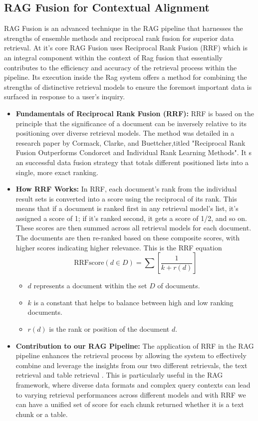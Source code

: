 \subsection{RAG Fusion for Contextual Alignment}
RAG Fusion is an advanced technique in the RAG pipeline that harnesses the strengths of ensemble methods and reciprocal rank fusion for superior data retrieval.
\vskip 0.5cm
At it's core RAG Fusion uses Reciprocal Rank Fusion (RRF) which is an integral component within the context of Rag fusion that essentially contributes to the efficiency and accuracy of the retrieval process within the pipeline. Its execution inside the Rag system offers a method for combining the strengths of distinctive retrieval models to ensure the foremost important data is surfaced in response to a user's inquiry.
\begin{itemize}
    \item \textbf{Fundamentals of Reciprocal Rank Fusion (RRF):} RRF is based on the principle that the significance of a document can be inversely relative to its positioning over diverse retrieval models. The method was detailed in a research paper by Cormack, Clarke, and Buettcher,titled "Reciprocal Rank Fusion Outperforms Condorcet and Individual Rank Learning Methods"\cite{w17}. It s an successful data fusion strategy that totals different positioned lists into a single, more exact ranking.
    \vskip 0.5cm
    \item \textbf{How RRF Works:} In RRF, each document's rank from the individual result sets is converted into a score using the reciprocal of its rank. This means that if a document is ranked first in any retrieval model's list, it's assigned a score of 1; if it's ranked second, it gets a score of 1/2, and so on. These scores are then summed across all retrieval models for each document. The documents are then re-ranked based on these composite scores, with higher scores indicating higher relevance. This is the RRF equation
    \vskip 0.5cm
    \[
\text{RRFscore}(d \in D) = \sum \left[ \frac{1}{k + r(d)} \right]
\]

\begin{itemize}
  \item \( d \) represents a document within the set \( D \) of documents.
  \item \( k \) is a constant that helps to balance between high and low ranking documents.
  \item \( r(d) \) is the rank or position of the document \( d \).
\end{itemize}
\item \textbf{Contribution to our RAG Pipeline:} The application of RRF in the RAG pipeline enhances the retrieval process by allowing the system to effectively combine and leverage the insights from our two different retrievals, the text retrieval and table retrieval . This is particularly useful in the RAG framework, where diverse data formats and complex query contexts can lead to varying retrieval performances across different models and with RRF we can have a unified set of score for each chunk returned whether it is a text chunk or a table.
\end{itemize}
